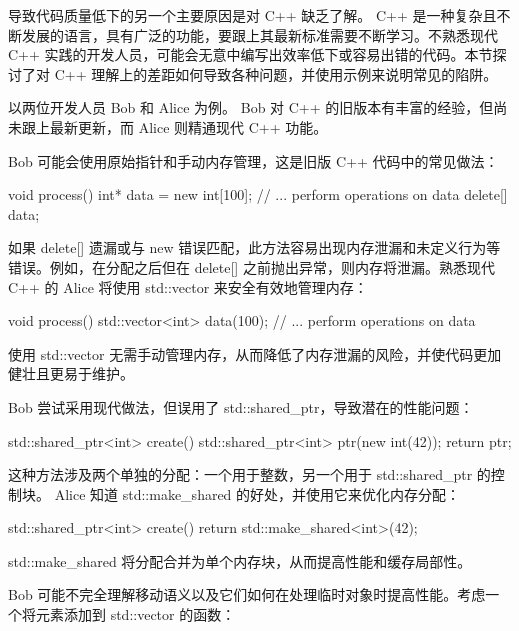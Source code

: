 
导致代码质量低下的另一个主要原因是对 C++ 缺乏了解。 C++ 是一种复杂且不断发展的语言，具有广泛的功能，要跟上其最新标准需要不断学习。不熟悉现代 C++ 实践的开发人员，可能会无意中编写出效率低下或容易出错的代码。本节探讨了对 C++ 理解上的差距如何导致各种问题，并使用示例来说明常见的陷阱。

以两位开发人员 Bob 和 Alice 为例。 Bob 对 C++ 的旧版本有丰富的经验，但尚未跟上最新更新，而 Alice 则精通现代 C++ 功能。


Bob 可能会使用原始指针和手动内存管理，这是旧版 C++ 代码中的常见做法：

\begin{cpp}
void process() {
    int* data = new int[100];
    // ... perform operations on data
    delete[] data;
}
\end{cpp}

如果 delete[] 遗漏或与 new 错误匹配，此方法容易出现内存泄漏和未定义行为等错误。例如，在分配之后但在 delete[] 之前抛出异常，则内存将泄漏。熟悉现代 C++ 的 Alice 将使用 std::vector 来安全有效地管理内存：

\begin{cpp}
void process() {
    std::vector<int> data(100);
    // ... perform operations on data
}
\end{cpp}

使用 std::vector 无需手动管理内存，从而降低了内存泄漏的风险，并使代码更加健壮且更易于维护。


Bob 尝试采用现代做法，但误用了 std::shared\_ptr，导致潜在的性能问题：

\begin{cpp}
std::shared_ptr<int> create() {
    std::shared_ptr<int> ptr(new int(42));
    return ptr;
}
\end{cpp}

这种方法涉及两个单独的分配：一个用于整数，另一个用于 std::shared\_ptr 的控制块。 Alice 知道 std::make\_shared 的好处，并使用它来优化内存分配：

\begin{cpp}
std::shared_ptr<int> create() {
    return std::make_shared<int>(42);
}
\end{cpp}

std::make\_shared 将分配合并为单个内存块，从而提高性能和缓存局部性。


Bob 可能不完全理解移动语义以及它们如何在处理临时对象时提高性能。考虑一个将元素添加到 std::vector 的函数：

